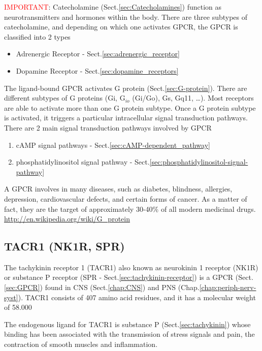 \textcolor{red}{IMPORTANT}: Catecholamine (Sect.\ref{sec:Catecholamines})
function as neurotransmitters and hormones within the body. There are three
subtypes of catecholamine, and depending on which one activates GPCR,
the GPCR is classified into 2 types
\begin{itemize}
  \item Adrenergic Receptor - Sect.\ref{sec:adrenergic_receptor}
  \item Dopamine Receptor - Sect.\ref{sec:dopamine_receptors}
\end{itemize}

The ligand-bound GPCR activates G protein (Sect.\ref{sec:G-protein}).
There are different subtypes of G proteins (Gi, G$_{io}$ (Gi/Go), Gs, Gq11,
\ldots). Most receptors are able to activate more than one G protein subtype.
Once a G protein subtype is activated, it triggers a particular intracellular
signal transduction pathways. There are 2 main signal transduction pathways
involved by GPCR
\begin{enumerate}
  \item cAMP signal pathways - Sect.\ref{sec:cAMP-dependent_pathway}
  \item phosphatidylinositol signal pathway - Sect.\ref{sec:phosphatidylinositol-signal-pathway}
\end{enumerate}

\begin{mdframed}
A GPCR involves in many diseases, 
such as diabetes, blindness, allergies, depression, cardiovascular defects, and
certain forms of cancer. As a matter of fact, they are the target of
approximately 30-40\% of all modern medicinal drugs.
\url{http://en.wikipedia.org/wiki/G_protein} 
\end{mdframed}

\subsection{TACR1 (NK1R, SPR)}
\label{sec:TACR1}
\label{sec:NK1R}

The tachykinin receptor 1 (TACR1) also known as neurokinin 1 receptor (NK1R) or
substance P receptor (SPR - Sect.\ref{sec:tachykinin-receptor}) is a GPCR
(Sect.\ref{sec:GPCR}) found in CNS (Sect.\ref{chap:CNS}) and PNS (Chap.\ref{chap:periph-nerv-syst}).
TACR1 consists of 407 amino acid residues, and it has a molecular weight of
58.000

The endogenous ligand for TACR1 is substance P (Sect.\ref{sec:tachykinin}) whose
binding has been associated with the transmission of stress signals and pain,
the contraction of smooth muscles and inflammation.

